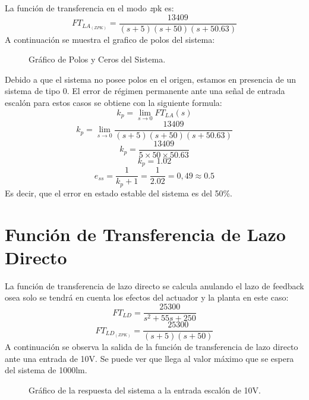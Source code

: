 \documentclass[a4paper,11pt]{article}
\begin{document}
La función de transferencia en el modo \emph zpk es:
$$FT_{LA_{(ZPK)}}=\frac{13409}{(s + 5)(s + 50)(s + 50.63)}$$
A continuación se muestra el grafico de polos del sistema:
  \begin{figure}[H] %
	\caption{Gráfico de Polos y Ceros del Sistema.}
	\label{fig:cp1}
	\end{figure} 
Debido a que el sistema no posee polos en el origen, estamos en presencia de un sistema de tipo 0. El error de régimen permanente ante una señal de entrada escalón para estos casos se obtiene con la siguiente formula:
$$k_p=\lim\limits_{s\rightarrow 0}FT_{LA}(s) $$
$$k_p=\lim\limits_{s\rightarrow 0}\frac{13409}{(s + 5)(s + 50)(s + 50.63)} $$
$$k_p=\frac{13409}{5\times50\times50.63} $$
$$k_p= 1.02$$
$$e_{ss}=\frac{1}{k_p+1}=\frac{1}{2.02}=0,49\approx0.5 $$
Es decir, que el error en estado estable del sistema es del 50\%.
\section{Función de Transferencia de Lazo Directo}
La función de transferencia de lazo directo se calcula anulando el lazo de feedback osea solo se tendrá en cuenta los efectos del actuador y la planta en este caso:
$$FT_{LD}=\frac{25300}{s^2 + 55 s + 250}$$
$$FT_{LD_{(ZPK)}}=\frac{25300}{(s + 5)(s + 50)}$$
A continuación se observa la salida de la función de transferencia de lazo directo ante una entrada de 10V. Se puede ver que llega al valor máximo que se espera del sistema de 1000lm.

  \begin{figure}[H] %
	\caption{Gráfico de la respuesta del sistema a la entrada escalón de 10V.}
	\label{fig:resp_esc1}
	\end{figure} 
\end{document}
